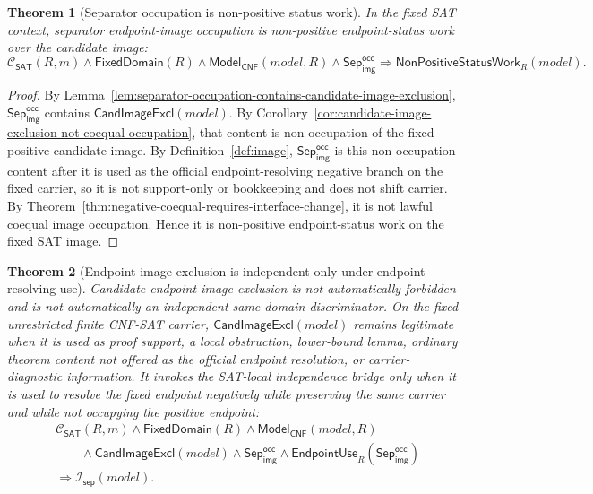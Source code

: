 \documentclass[11pt]{article}
\newtheorem{theorem}{Theorem}[section]
\theoremstyle{definition}
\theoremstyle{remark}
\newcommand{\SepImgOcc}{\mathsf{Sep}_{\mathsf{img}}^{\mathsf{occ}}}
\newcommand{\ClayCtx}{\mathcal{C}_{\mathsf{SAT}}(R,m)}
\newcommand{\EndpointUse}{\mathsf{EndpointUse}}
\newcommand{\FixedDom}{\mathsf{FixedDomain}}
\newcommand{\SepIndBridge}{\mathcal{I}_{\mathsf{sep}}}
\newcommand{\ModelOfCnf}{\mathsf{Model}_{\mathsf{CNF}}}
\newcommand{\CandImageExcl}{\mathsf{CandImageExcl}}
\newcommand{\NonPositiveStatusWork}{\mathsf{NonPositiveStatusWork}}
\begin{document}
\begin{theorem}[Separator occupation is non-positive status work]\label{thm:sepocc-is-non-positive-status-work}
In the fixed SAT context, separator endpoint-image occupation is non-positive endpoint-status work over the candidate image:
\[
  \ClayCtx\wedge\FixedDom(R)\wedge\ModelOfCnf(model,R)\wedge\SepImgOcc
  \Rightarrow \NonPositiveStatusWork_R(model).
\]
\end{theorem}

\begin{proof}
By Lemma~\ref{lem:separator-occupation-contains-candidate-image-exclusion}, \(\SepImgOcc\) contains \(\CandImageExcl(model)\). By Corollary~\ref{cor:candidate-image-exclusion-not-coequal-occupation}, that content is non-occupation of the fixed positive candidate image. By Definition~\ref{def:image}, \(\SepImgOcc\) is this non-occupation content after it is used as the official endpoint-resolving negative branch on the fixed carrier, so it is not support-only or bookkeeping and does not shift carrier. By Theorem~\ref{thm:negative-coequal-requires-interface-change}, it is not lawful coequal image occupation. Hence it is non-positive endpoint-status work on the fixed SAT image.
\end{proof}

\begin{theorem}[Endpoint-image exclusion is independent only under endpoint-resolving use]\label{thm:endpoint-image-exclusion-independent-only-under-endpoint-use}
Candidate endpoint-image exclusion is not automatically forbidden and is not automatically an independent same-domain discriminator. On the fixed unrestricted finite CNF-SAT carrier, \(\CandImageExcl(model)\) remains legitimate when it is used as proof support, a local obstruction, lower-bound lemma, ordinary theorem content not offered as the official endpoint resolution, or carrier-diagnostic information. It invokes the SAT-local independence bridge only when it is used to resolve the fixed endpoint negatively while preserving the same carrier and while not occupying the positive endpoint:
\[
\begin{aligned}
  &\ClayCtx\wedge\FixedDom(R)\wedge\ModelOfCnf(model,R)\\
  &\qquad\wedge\CandImageExcl(model)\wedge\SepImgOcc\wedge\EndpointUse_R(\SepImgOcc)\\
  &\Rightarrow \SepIndBridge(model).
\end{aligned}
\]
\end{theorem}
\end{document}
